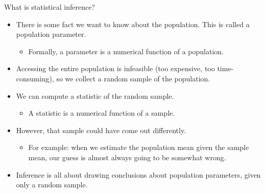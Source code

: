 \documentclass[aspectratio=169]{../latex_main/tntbeamer}  %
\begin{document}
	
	\begin{frame}{What is statistical inference?}
	    \begin{itemize}
	        \item There is some fact we want to know about the population. This is called a population parameter.
	        \begin{itemize}
	            \item Formally, a parameter is a numerical function of a population. 
	        \end{itemize}
	        \item Accessing the entire population is infeasible (too expensive, too time-consuming), so we collect a random sample of the population.
	        \item We can compute a statistic of the random sample.
	        \begin{itemize}
	            \item A statistic is a numerical function of a sample.
	        \end{itemize}
	        \item However, that sample could have come out differently.
	        \begin{itemize}
	            \item For example: when we estimate the population mean given the sample mean, our guess is almost always going to be somewhat wrong.
	        \end{itemize}
	        \item Inference is all about drawing conclusions about population parameters, given only a random sample.
	    \end{itemize}
	\end{frame}
	
\end{document}
